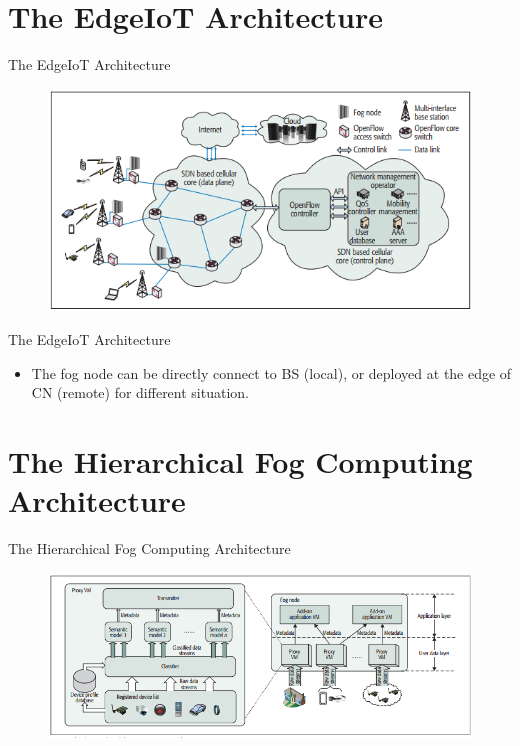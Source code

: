 \documentclass{beamer}
\begin{document}
\section{The EdgeIoT Architecture}
\begin{frame} {The EdgeIoT Architecture} 
    \begin{figure}[t]
        \centering
        \includegraphics[width=1.1\textwidth]{figures/3.png}
        
    \end{figure}
\end{frame}

\begin{frame} {The EdgeIoT Architecture} 
    \begin{itemize}
         \item {The fog node can be directly connect to BS (local), or deployed at the edge of CN (remote) for different situation.}
    \end{itemize}
\end{frame}

\section{The Hierarchical Fog Computing Architecture}
\begin{frame} {The Hierarchical Fog Computing Architecture} 
    \begin{figure}[t]
        \centering
        \includegraphics[width=1.1\textwidth]{figures/4.png}
        
    \end{figure}
\end{frame}
\end{document}
